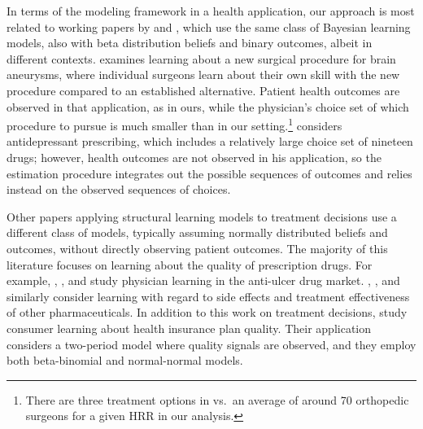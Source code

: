 \documentclass[12pt]{article}
\begin{document}
In terms of the modeling framework in a health application, our approach is most related to working papers by \cite{gong2018} and \cite{dickstein2018}, which use the same class of Bayesian learning models, also with beta distribution beliefs and binary outcomes, albeit in different contexts. \cite{gong2018} examines learning about a new surgical procedure for brain aneurysms, where individual surgeons learn about their own skill with the new procedure compared to an established alternative. Patient health outcomes are observed in that application, as in ours, while the physician's choice set of which procedure to pursue is much smaller than in our setting.\footnote{There are three treatment options in \cite{gong2018} vs.~an average of around 70 orthopedic surgeons for a given HRR in our analysis.} \cite{dickstein2018} considers antidepressant prescribing, which includes a relatively large choice set of nineteen drugs; however, health outcomes are not observed in his application, so the estimation procedure integrates out the possible sequences of outcomes and relies instead on the observed sequences of choices.

Other papers applying structural learning models to treatment decisions use a different class of models, typically assuming normally distributed beliefs and outcomes, without directly observing patient outcomes. The majority of this literature focuses on learning about the quality of prescription drugs. For example, \cite{coscelli2004}, \cite{crawford2005}, and \cite{ferreyra2011} study physician learning in the anti-ulcer drug market. \cite{ching2010}, \cite{chan2013}, and \cite{dickstein2018} similarly consider learning with regard to side effects and treatment effectiveness of other pharmaceuticals. In addition to this work on treatment decisions, \cite*{chernew2008} study consumer learning about health insurance plan quality. Their application considers a two-period model where quality signals are observed, and they employ both beta-binomial and normal-normal models.
\end{document}
